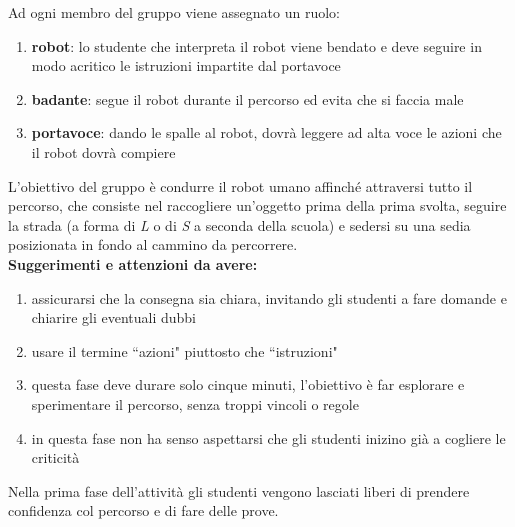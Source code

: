\documentclass[12pt]{article}
\begin{document}
Ad ogni membro del gruppo viene assegnato un ruolo:

\begin{enumerate}
\item \textbf{robot}: lo studente che interpreta il robot viene bendato e deve seguire in modo acritico le istruzioni impartite dal portavoce
\item \textbf{badante}: segue il robot durante il percorso ed evita che si faccia male
\item \textbf{portavoce}: dando le spalle al robot, dovrà leggere ad alta voce le azioni che il robot dovrà compiere
\end{enumerate}

L'obiettivo del gruppo è condurre il robot umano affinché attraversi tutto il percorso, che consiste nel raccogliere un'oggetto prima della prima svolta, seguire la strada (a forma di \textit{L} o di \textit{S} a seconda della scuola) e sedersi su una sedia posizionata in fondo al cammino da percorrere.\\

\textbf{Suggerimenti e attenzioni da avere:}
\begin{enumerate}
\item assicurarsi che la consegna sia chiara, invitando gli studenti a fare domande e chiarire gli eventuali dubbi
\item usare il termine ``azioni" piuttosto che ``istruzioni"
\item questa fase deve durare solo cinque minuti, l'obiettivo è far esplorare e sperimentare il percorso, senza troppi vincoli o regole
\item in questa fase non ha senso aspettarsi che gli studenti inizino già a cogliere le criticità
\end{enumerate}

Nella prima fase dell'attività gli studenti vengono lasciati liberi di prendere confidenza col percorso e di fare delle prove.
\end{document}

